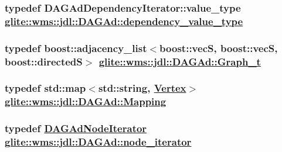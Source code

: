 \hypertarget{classglite_1_1wms_1_1jdl_1_1DAGAd_w3}{
\subsubsection[dependency\_\-value\_\-type]{\setlength{\rightskip}{0pt plus 5cm}typedef DAGAd\-Dependency\-Iterator::value\_\-type \hyperlink{classglite_1_1wms_1_1jdl_1_1DAGAd_w3}{glite::wms::jdl::DAGAd::dependency\_\-value\_\-type}}}
\label{classglite_1_1wms_1_1jdl_1_1DAGAd_w3}


\hypertarget{classglite_1_1wms_1_1jdl_1_1DAGAd_w4}{
\subsubsection[Graph\_\-t]{\setlength{\rightskip}{0pt plus 5cm}typedef boost::adjacency\_\-list$<$boost::vec\-S, boost::vec\-S, boost::directed\-S$>$ \hyperlink{classglite_1_1wms_1_1jdl_1_1DAGAd_w4}{glite::wms::jdl::DAGAd::Graph\_\-t}}}
\label{classglite_1_1wms_1_1jdl_1_1DAGAd_w4}


\hypertarget{classglite_1_1wms_1_1jdl_1_1DAGAd_w7}{
\subsubsection[Mapping]{\setlength{\rightskip}{0pt plus 5cm}typedef std::map$<$std::string, \hyperlink{classglite_1_1wms_1_1jdl_1_1DAGAd_w5}{Vertex}$>$ \hyperlink{classglite_1_1wms_1_1jdl_1_1DAGAd_w7}{glite::wms::jdl::DAGAd::Mapping}}}
\label{classglite_1_1wms_1_1jdl_1_1DAGAd_w7}


\hypertarget{classglite_1_1wms_1_1jdl_1_1DAGAd_w0}{
\subsubsection[node\_\-iterator]{\setlength{\rightskip}{0pt plus 5cm}typedef \hyperlink{classglite_1_1wms_1_1jdl_1_1DAGAdNodeIterator}{DAGAd\-Node\-Iterator} \hyperlink{classglite_1_1wms_1_1jdl_1_1DAGAdNodeIterator}{glite::wms::jdl::DAGAd::node\_\-iterator}}}
\label{classglite_1_1wms_1_1jdl_1_1DAGAd_w0}


